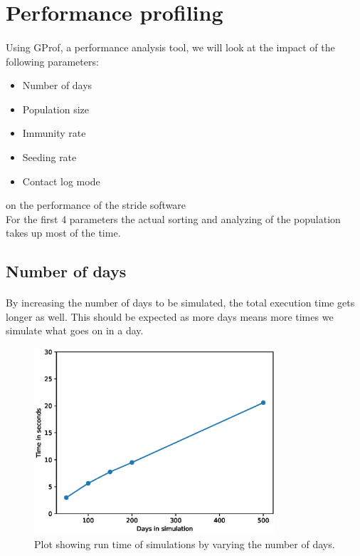 \documentclass[runningheads]{llncs}
\begin{document}
\clearpage
\section{Performance profiling}

\paragraph{} Using GProf, a performance analysis tool, we will look at the impact of the following parameters:
\begin{itemize}
	\item Number of days
	\item Population size
	\item Immunity rate
	\item Seeding rate
	\item Contact log mode
\end{itemize}
on the performance of the stride software
\\
For the first 4 parameters
the actual sorting and analyzing of the population takes up most of the time.

\subsection{Number of days}

\paragraph{} By increasing the number of days to be simulated, the total execution time gets longer as well. This should be expected as more days means more times we simulate what goes on in a day.
\begin{figure}[h!]
\centering
	\includegraphics[width=0.8\textwidth]{3_Performance_Profiling/3_numdays.eps}
	\caption{Plot showing run time of simulations by varying the number of days.} 
	\label{Gprof_numdays}
\end{figure}
\end{document}
